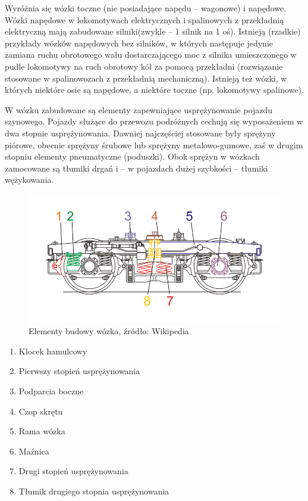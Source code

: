Wyróżnia się wózki toczne (nie posiadające napędu – wagonowe) i napędowe. Wózki napędowe w lokomotywach elektrycznych i spalinowych z przekładnią elektryczną mają zabudowane silniki(zwykle – 1 silnik na 1 oś). Istnieją (rzadkie) przykłady wózków napędowych bez silników, w których następuje jedynie zamiana ruchu obrotowego wału dostarczającego moc z silnika umieszczonego w pudle lokomotywy na ruch obrotowy kół za pomocą przekładni (rozwiązanie stosowane w spalinowozach z przekładnią mechaniczną). Istnieją też wózki, w których niektóre osie są napędowe, a niektóre toczne (np. lokomotywy spalinowe).

W wózku zabudowane są elementy zapewniające usprężynowanie pojazdu szynowego. Pojazdy służące do przewozu podróżnych cechują się wyposażeniem w dwa stopnie usprężynowania. Dawniej najczęściej stosowane były sprężyny piórowe, obecnie sprężyny śrubowe lub sprężyny metalowo-gumowe, zaś w drugim stopniu elementy pneumatyczne (poduszki). Obok sprężyn w wózkach zamocowane są tłumiki drgań i – w pojazdach dużej
szybkości – tłumiki wężykowania. 
	\begin{figure}
		\includegraphics[width=15cm]{skryptkierownik-img/skryptkierownik-img027.png}
		\caption{Elementy budowy wózka, źródło: Wikipedia}
		\label{fig:wozek}
	\end{figure}

\begin{enumerate}
	\item Klocek hamulcowy
	\item Pierwszy stopień usprężynowania
	\item Podparcia boczne
	\item Czop skrętu
	\item Rama wózka
	\item Maźnica
	\item Drugi stopień usprężynowania
	\item Tłumik drugiego stopnia usprężynowania
\end{enumerate}


